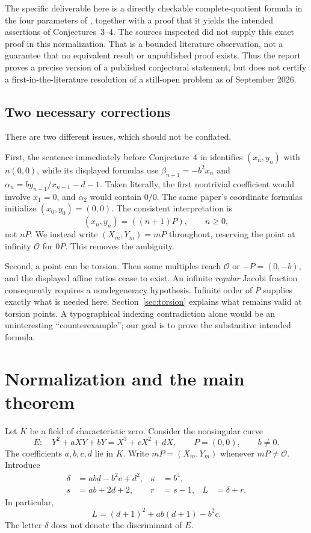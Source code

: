 \documentclass[11pt,letterpaper]{article}
\numberwithin{equation}{section}
\theoremstyle{definition}
\theoremstyle{remark}
\newcommand{\K}{K}
\newcommand{\OO}{\mathcal{O}}
\begin{document}
The specific deliverable here is a directly checkable complete-quotient
formula in the four parameters of \cite{Barry2023}, together with a proof
that it yields the intended assertions of Conjectures~3--4. The sources
inspected did not supply this exact proof in this normalization. That is a
bounded literature observation, not a guarantee that no equivalent result
or unpublished proof exists. Thus the report proves a precise version of a
published conjectural statement, but does not certify a first-in-the-literature
resolution of a still-open problem as of September 2026.

\subsection{Two necessary corrections}
There are two different issues, which should not be conflated.

First, the sentence immediately before Conjecture~4 in \cite{Barry2023}
identifies $(x_n,y_n)$ with $n(0,0)$, while its displayed formulas use
$\beta_{n+1}=-b^2x_n$ and
$\alpha_n=by_{n-1}/x_{n-1}-d-1$. Taken literally, the first nontrivial
coefficient would involve $x_1=0$, and $\alpha_2$ would contain $0/0$.
The same paper's coordinate formulas initialize $(x_0,y_0)=(0,0)$.
The consistent interpretation is
\begin{equation}\label{eq:indexing}
 (x_n,y_n)=((n+1)P),\qquad n\ge0,
\end{equation}
not $nP$. We instead write $(X_m,Y_m)=mP$ throughout, reserving the
point at infinity $\OO$ for $0P$. This removes the ambiguity.

Second, a point can be torsion. Then some multiples reach $\OO$ or
$-P=(0,-b)$, and the displayed affine ratios cease to exist. An infinite
\emph{regular} Jacobi fraction consequently requires a nondegeneracy
hypothesis. Infinite order of $P$ supplies exactly what is needed here.
Section~\ref{sec:torsion} explains what remains valid at torsion points.
A typographical indexing contradiction alone would be an uninteresting
``counterexample''; our goal is to prove the substantive intended formula.

\section{Normalization and the main theorem}\label{sec:setup}

Let $\K$ be a field of characteristic zero. Consider the nonsingular curve
\begin{equation}\label{eq:curve}
 E:\quad Y^2+aXY+bY=X^3+cX^2+dX,
 \qquad P=(0,0),\qquad b\ne0.
\end{equation}
The coefficients $a,b,c,d$ lie in $\K$. Write $mP=(X_m,Y_m)$ whenever
$mP\ne\OO$. Introduce
\begin{align}
 \delta&=abd-b^2c+d^2,& \kappa&=b^4,\label{eq:parameters1}\\
 s&=ab+2d+2,& r&=s-1,& L&=\delta+r.\label{eq:parameters2}
\end{align}
In particular,
\[
 L=(d+1)^2+ab(d+1)-b^2c.
\]
The letter $\delta$ does not denote the discriminant of $E$.
\end{document}
